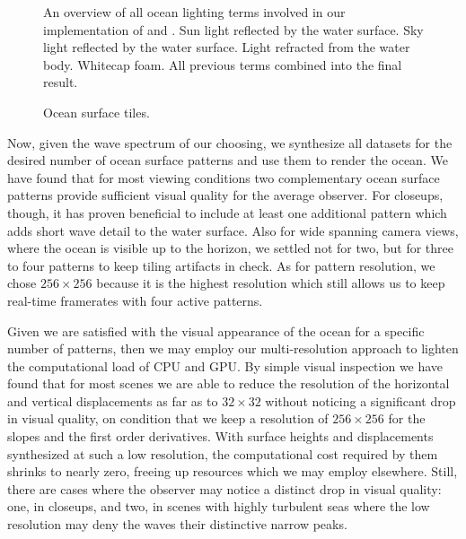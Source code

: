 \begin{figure}
{	\label{fig:results:complete}
 }
\caption[An overview of all ocean lighting terms involved in our implementation.]{
An overview of all ocean lighting terms involved in our implementation
of \citet{article:oceanlighting,misc:oceanlightingfft} and \citet{article:whitecaps}.
 Sun light reflected by the water surface.
 Sky light reflected by the water surface.
 Light refracted from the water body.
 Whitecap foam.
 All previous terms combined into the final
result.
}
\label{fig:results:lighting}
\end{figure}
%
%
\begin{figure}
\centering
\caption[Depiction of ocean surface tiles.]{Ocean surface tiles.}
\label{fig:results:tiling}
\end{figure}
%
%

Now, given the wave spectrum of our choosing, we synthesize all datasets
for the desired number of ocean surface patterns and use them to render
the ocean. We have found that for most viewing conditions two complementary
ocean surface patterns provide sufficient visual quality for the
average observer. For closeups, though, it has proven beneficial to
include at least one additional pattern which adds short wave detail to
the water surface. Also for wide spanning camera views, where the ocean
is visible up to the horizon, we settled not for two, but for three to
four patterns to keep tiling artifacts in check. As for pattern resolution,
we chose $256\times256$ because it is the highest resolution which
still allows us to keep real-time framerates with four active patterns.

Given we are satisfied with the visual appearance of the ocean for a specific
number of patterns, then we may employ our multi-resolution approach
to lighten the computational load of CPU and GPU. By simple visual inspection
we have found that for most scenes we are able to reduce the resolution of
the horizontal and vertical displacements as far as to $32\times32$ without
noticing a significant drop in visual quality, on condition that we keep a
resolution of $256\times256$ for the slopes and the first order derivatives.
%
With surface heights and displacements synthesized at such a low resolution,
the computational cost required by them shrinks to nearly zero, freeing
up resources which we may employ elsewhere.
%
Still, there are cases where the observer may notice a distinct drop in
visual quality: one, in closeups, and two, in scenes with highly turbulent
seas where the low resolution may deny the waves their distinctive narrow
peaks.
%

